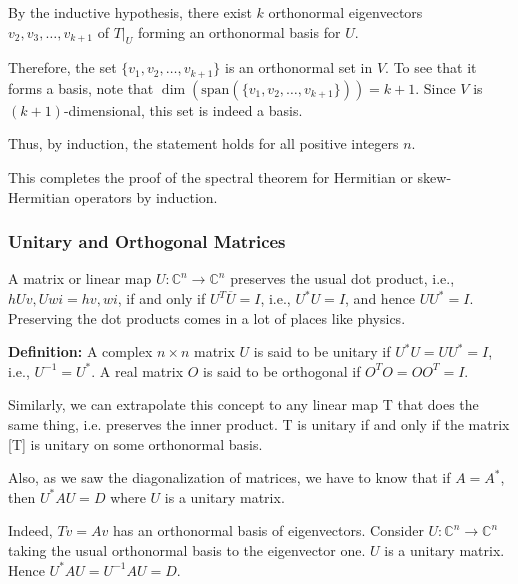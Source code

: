 By the inductive hypothesis, there exist \(k\) orthonormal eigenvectors \(v_2, v_3, \ldots, v_{k+1}\) of \(T|_U\) forming an orthonormal basis for \(U\).

Therefore, the set \(\{v_1, v_2, \ldots, v_{k+1}\}\) is an orthonormal set in \(V\). To see that it forms a basis, note that \(\dim(\text{span}(\{v_1, v_2, \ldots, v_{k+1}\})) = k+1\). Since \(V\) is \((k+1)\)-dimensional, this set is indeed a basis.

Thus, by induction, the statement holds for all positive integers \(n\).

This completes the proof of the spectral theorem for Hermitian or skew-Hermitian operators by induction.


\subsubsection{Unitary and Orthogonal Matrices}

A matrix or linear map \( U : \mathbb{C}^n \to \mathbb{C}^n \) preserves the usual dot product, i.e., \( hUv, Uw i = hv, wi \), if and only if \( U^T \overline{U} = I \), i.e., \( U^* U = I \), and hence \( UU^* = I \). Preserving the dot products comes in a lot of places like physics. 

\textbf{Definition:} A complex \( n \times n \) matrix \( U \) is said to be unitary if \( U^* U = UU^* = I \), i.e., \( U^{-1} = U^* \). A real matrix \( O \) is said to be orthogonal if \( O^T O = OO^T = I \).


Similarly, we can extrapolate this concept to any linear map T that does the same thing, i.e. preserves the inner product. T is unitary if and only if the matrix [T] is unitary on some orthonormal basis.

Also, as we saw the diagonalization of matrices, we have to know that if \(A = A^*\), then \(U^*AU = D\) where \(U\) is a unitary matrix.

Indeed, \(Tv = Av\) has an orthonormal basis of eigenvectors. Consider \(U : \mathbb{C}^n \to \mathbb{C}^n\) taking the usual orthonormal basis to the eigenvector one. \(U\) is a unitary matrix. Hence \(U^*AU = U^{-1}AU = D\).







